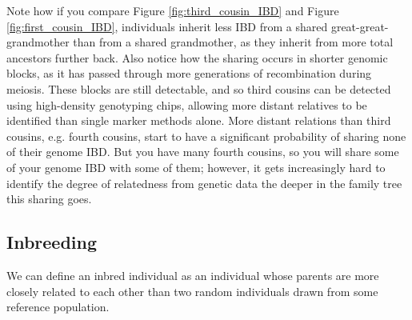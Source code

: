 {{Note how if you compare Figure \ref{fig:third_cousin_IBD} and Figure \ref{fig:first_cousin_IBD}, individuals inherit less IBD from a shared great-great-grandmother than from a shared grandmother, as they inherit from more total ancestors further back. Also notice how the sharing occurs in shorter genomic blocks, as it has passed through more generations of recombination during meiosis. These blocks are still detectable, and so third cousins can be detected using high-density genotyping chips, allowing more distant relatives to be identified than single marker methods alone.  More distant relations than third cousins, e.g. fourth cousins, start to have a significant probability of sharing none of their genome IBD. But you have many fourth cousins, so you will share some of your genome IBD with some of them; however, it gets increasingly hard to identify the degree of relatedness from genetic data the deeper in the family tree this sharing goes.

\subsection{Inbreeding}
We can define an inbred individual as an individual whose parents are
more closely related to each other than two random individuals drawn
from some reference population.  \\


}}
